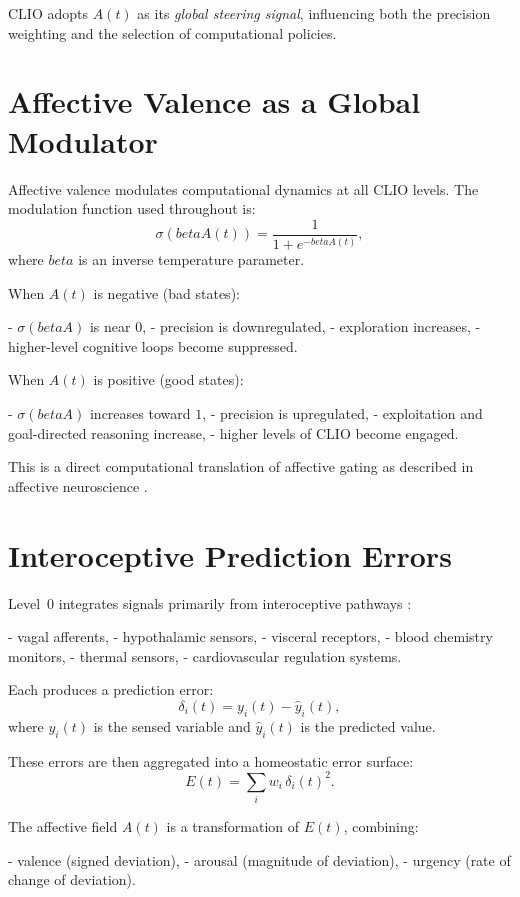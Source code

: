 \documentclass[12pt,oneside]{book}
\theoremstyle{plain}
\theoremstyle{definition}
\let\citep\parencite
\def\beta{beta}%
\begin{document}
CLIO adopts $A(t)$ as its \emph{global steering signal}, influencing both
the precision weighting and the selection of computational policies.

\section{Affective Valence as a Global Modulator}

Affective valence modulates computational dynamics at all CLIO levels.
The modulation function used throughout is:
\[
\sigma(\beta A(t)) = \frac{1}{1 + e^{-\beta A(t)}},
\]
where $\beta$ is an inverse temperature parameter.

When $A(t)$ is negative (bad states):

- $\sigma(\beta A)$ is near $0$,
- precision is downregulated,
- exploration increases,
- higher-level cognitive loops become suppressed.

When $A(t)$ is positive (good states):

- $\sigma(\beta A)$ increases toward $1$,
- precision is upregulated,
- exploitation and goal-directed reasoning increase,
- higher levels of CLIO become engaged.

This is a direct computational translation of affective gating as
described in affective neuroscience
\citep{panksepp1998affective,barrett2017emotions}.

\section{Interoceptive Prediction Errors}

Level~0 integrates signals primarily from interoceptive pathways
\citep{barrett2020interoception,khalsa2018interoception}:

- vagal afferents,
- hypothalamic sensors,
- visceral receptors,
- blood chemistry monitors,
- thermal sensors,
- cardiovascular regulation systems.

Each produces a prediction error:
\[
\delta_i(t) = y_i(t) - \hat{y}_i(t),
\]
where $y_i(t)$ is the sensed variable and $\hat{y}_i(t)$ is the predicted
value.

These errors are then aggregated into a homeostatic error surface:
\[
E(t) = \sum_i w_i \, \delta_i(t)^2.
\]

The affective field $A(t)$ is a transformation of $E(t)$, combining:

- valence (signed deviation),
- arousal (magnitude of deviation),
- urgency (rate of change of deviation).
\end{document}
